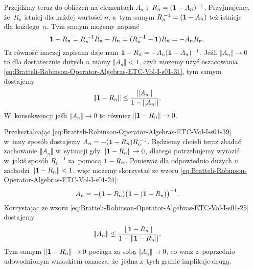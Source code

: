 \documentclass[a4paper,11pt]{article}
\begin{document}
Przejdźmy teraz do obliczeń na elementach $A_{ n }$
i~$R_{ n } = ( \mathbf{1} - A_{ n } )^{ -1 }$. Przyjmujemy, że~$R_{ n }$ istniej
dla każdej wartości $n$, a~tym samym
$R_{ n }^{ \; -1 } = ( \mathbf{1} - A_{ n } )$ też istnieje dla każdego~$n$. Tym
samym możemy napisać
\begin{equation}
  \label{eq:Bratteli-Robinson-Operator-Algebras-ETC-Vol-I-s01-39}
  \mathbf{1} - R_{ n } = R_{ n }^{ \; -1 } R_{ n } - R_{ n } =
  ( R_{ n }^{ \; -1 } - \mathbf{1} ) R_{ n } =
  -A_{ n } R_{ n }.
\end{equation}
Ta równość inaczej zapisana daje nam
$\mathbf{1} - R_{ n } = -A_{ n } ( \mathbf{1} - A_{ n } )^{ -1 }$. Jeśli
$\Vert A_{ n } \Vert \to 0$ to dla dostatecznie dużych $n$ mamy $\Vert A_{ n } \Vert < 1$,
czyli możemy użyć oszacowania
\eqref{eq:Bratteli-Robinson-Operator-Algebras-ETC-Vol-I-s01-31}, tym samym
dostajemy
\begin{equation}
  \label{eq:Bratteli-Robinson-Operator-Algebras-ETC-Vol-I-s01-40}
  \Vert \mathbf{1} - R_{ n } \Vert \leq
  \frac{ \Vert A_{ n } \Vert }{ 1 - \Vert A_{ n } \Vert }.
\end{equation}
W~konsekwencji jeśli $\Vert A_{ n } \Vert \to 0$ to również
$\Vert \mathbf{1} - R_{ n } \Vert \to 0$.

Przekształcając
\eqref{eq:Bratteli-Robinson-Operator-Algebras-ETC-Vol-I-s01-39} w~inny
sposób dostajemy $A_{ n } = -( \mathbf{1} - R_{ n } ) R_{ n }^{ \; -1 }$. Będziemy
chcieli teraz zbadać zachowanie $\Vert A_{ n } \Vert$ w~sytuacji gdy
$\Vert \mathbf{1} - R_{ n } \Vert \to 0$, dlatego potrzebujemy wyrazić w~jakiś sposób
$R_{ n }^{ \; - 1 }$ za~pomocą $\mathbf{1} - R_{ n }$. Ponieważ dla
odpowiednio dużych $n$ zachodzi
$\Vert \mathbf{1} - R_{ n } \Vert < 1$, więc możemy skorzystać ze wzoru
\eqref{eq:Bratteli-Robinson-Operator-Algebras-ETC-Vol-I-s01-24}:
\begin{equation}
  \label{eq:Bratteli-Robinson-Operator-Algebras-ETC-Vol-I-s01-41}
  A_{ n } =
  -( \mathbf{1} - R_{ n } )
  \big( \mathbf{1} - ( \mathbf{1} - R_{ n } ) \big)^{ -1 }.
\end{equation}
Korzystając ze wzoru
\eqref{eq:Bratteli-Robinson-Operator-Algebras-ETC-Vol-I-s01-25} dostajemy
\begin{equation}
  \label{eq:Bratteli-Robinson-Operator-Algebras-ETC-Vol-I-s01-42}
  \Vert A_{ n } \Vert \leq
  \frac{ \Vert \mathbf{1} - R_{ n } \Vert }{ 1 - \Vert \mathbf{1} - R_{ n } \Vert }.
\end{equation}
Tym samym $\Vert \mathbf{1} - R_{ n } \Vert \to 0$ pociąga za sobą $\Vert A_{ n } \Vert \to 0$, co
wraz z~poprzednio udowodnionym wnioskiem oznacza, że~jedna z~tych granic
implikuje drugą.
\end{document}
